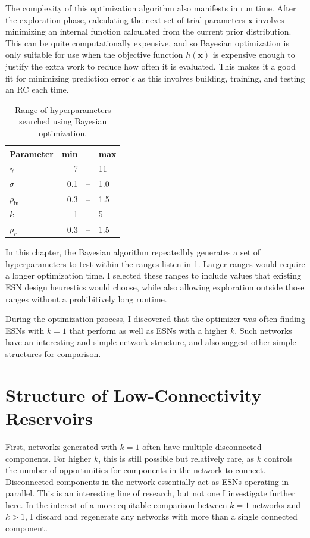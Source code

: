 The complexity of this optimization algorithm also manifests in run
time. After the exploration phase, calculating the next set of trial
parameters $\bm{x}$ involves minimizing an internal function
calculated from the current prior distribution. This can be quite
computationally expensive, and so Bayesian optimization is only
suitable for use when the objective function $h(\bm{x})$ is expensive
enough to justify the extra work to reduce how often it is
evaluated. This makes it a good fit for minimizing prediction error
$\tilde{\epsilon}$ as this involves building, training, and testing
an RC each time.

\begin{table}
  \caption{Range of hyperparameters searched using Bayesian optimization.}
  \begin{tabular}{lrcl}
    Parameter & min & & max \\
    \hline
    $\gamma$ & 7 & -- & 11 \\
    $\sigma$ & 0.1 & -- & 1.0 \\
    $\rho_\text{in}$ & 0.3 & -- & 1.5 \\
    $k$ & 1 & -- & 5 \\
    $\rho_r$ & 0.3 & -- & 1.5 \\
  \end{tabular}%
  \label{tab:bayes-ranges}
\end{table}

In this chapter, the Bayesian algorithm repeatedbly generates a set of
hyperparameters to test within the ranges listen in
\cref{tab:bayes-ranges}. Larger ranges would require a longer
optimization time. I selected these ranges to include values that
existing ESN design heurestics would choose, while also allowing
exploration outside those ranges without a prohibitively long runtime.

During the optimization process, I discovered that the optimizer was
often finding ESNs with $k = 1$ that perform as well as ESNs with a
higher $k$. Such networks have an interesting and simple network
structure, and also suggest other simple structures for comparison.

\section{Structure of Low-Connectivity Reservoirs}

First, networks generated with $k = 1$ often have multiple
disconnected components. For higher $k$, this is still possible but
relatively rare, as $k$ controls the number of opportunities for
components in the network to connect. Disconnected components in the
network essentially act as ESNs operating in parallel. This is an
interesting line of research,\cite{pathak2018} but not one I
investigate further here. In the interest of a more equitable
comparison between $k = 1$ networks and $k > 1$, I discard and
regenerate any networks with more than a single connected component.

